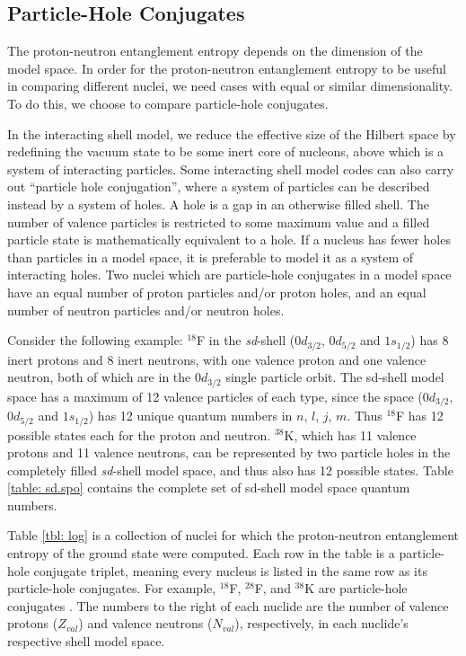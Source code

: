 \subsection{Particle-Hole Conjugates}
The proton-neutron entanglement entropy depends on the dimension of the 
model space. In order for the proton-neutron entanglement entropy to be useful in
comparing different nuclei, we need cases with equal or similar dimensionality. 
To do this, we choose to compare particle-hole conjugates. 

In the interacting shell model, 
we reduce the effective size of the Hilbert space by redefining the vacuum state 
to be some inert core of nucleons, above which is a system of interacting particles. 
Some interacting shell model codes can also carry out ``particle hole
conjugation''\cite{Brussard,Heyde}, where a system of particles can be
described instead by a system of holes. A hole is a gap in an otherwise filled shell.
The number of valence particles is restricted to some maximum value and a filled particle state
is mathematically equivalent to a hole. If a nucleus has fewer holes than particles
in a model space, it is preferable to model it as a system of interacting holes.
Two nuclei which are particle-hole conjugates in a model space have an equal
number of proton particles and/or proton holes, and an equal number of
neutron particles and/or neutron holes.

Consider the following example:
$^{18}$F in the \textit{sd}-shell ($0d_{3/2}$, $0d_{5/2}$ and $1s_{1/2}$) has 8 inert protons and 8 inert neutrons,
with one valence proton and one valence neutron, both of which are in the
$0d_{3/2}$ single particle orbit. The sd-shell model space has a maximum of 12 valence particles
of each type, since the space ($0d_{3/2}$, $0d_{5/2}$ and $1s_{1/2}$) has 12 unique
quantum numbers in $n$, $l$, $j$, $m$. Thus $^{18}$F has 12 possible states each for 
the proton and neutron. $^{38}$K, which has 11 valence protons and 11 valence neutrons, 
can be represented by two particle holes in the completely filled \textit{sd}-shell model space,
and thus also has 12 possible states. {Table \ref{table: sd.spo}} contains the complete set of
sd-shell model space quantum numbers.

Table \ref{tbl: log} is a collection of nuclei for which the proton-neutron 
entanglement entropy of the ground state were computed. Each row in the table
is a particle-hole conjugate triplet, meaning every nucleus is listed in the 
same row as its particle-hole conjugates. For example, $^{18}$F, $^{28}$F, and $^{38}$K
are particle-hole conjugates . The numbers to the right of each nuclide
are the number of valence protons ($Z_{val}$) and valence neutrons ($N_{val}$), 
respectively, in each nuclide's respective shell model space.

